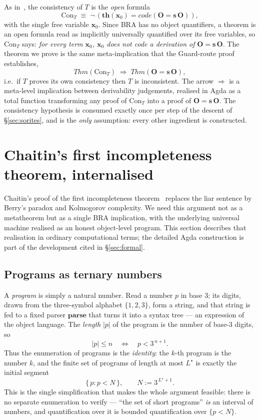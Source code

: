 \documentclass[11pt]{article}
\theoremstyle{plain}
\theoremstyle{definition}
\theoremstyle{remark}
\newcommand{\code}[1]{\mathit{code}(#1)}
\newcommand{\thmT}{\mathbf{th}}
\newcommand{\parse}{\mathbf{parse}}
\newcommand{\Con}{\mathrm{Con}}
\newcommand{\Thm}[1]{\mathit{Thm}(#1)}
\newcommand{\Lstar}{L^{\!\star}}
\begin{document}
As in~\cite{arGII}, the consistency of $T$ is the \emph{open} formula
\[
  \Con_T \;\equiv\; \neg\,(\thmT(\mathbf{x}_0) = \code{\mathbf{O}=\mathbf{s}\,\mathbf{O}}),
\]
with the single free variable $\mathbf{x}_0$. Since BRA has no object
quantifiers, a theorem is an open formula read as implicitly universally
quantified over its free variables, so $\Con_T$ says: \emph{for every
term $\mathbf{x}_0$, $\mathbf{x}_0$ does not code a derivation of}
$\mathbf{O}=\mathbf{s}\,\mathbf{O}$. The theorem we prove is the same
meta-implication that the Guard-route proof establishes,
\[
  \boxed{\;\Thm{\Con_T} \;\Longrightarrow\; \Thm{\mathbf{O}=\mathbf{s}\,\mathbf{O}},\;}
\]
i.e.\ if $T$ proves its own consistency then $T$ is inconsistent. The
arrow $\Longrightarrow$ is a meta-level implication between derivability
judgements, realised in Agda as a total function transforming any proof
of $\Con_T$ into a proof of $\mathbf{O}=\mathbf{s}\,\mathbf{O}$.
The consistency hypothesis is consumed exactly once per step of the
descent of \S\ref{sec:sorites}, and is the \emph{only} assumption: every
other ingredient is constructed.

\section{Chaitin's first incompleteness theorem, internalised}
\label{sec:chaitin}

Chaitin's proof of the first incompleteness theorem~\cite{Chaitin71,Chaitin74}
replaces the liar sentence by Berry's paradox and Kolmogorov complexity.
We need this argument not as a metatheorem but as a single BRA
implication, with the underlying universal machine realised as an honest
object-level program. This section describes that realisation in
ordinary computational terms; the detailed Agda construction is part of
the development cited in \S\ref{sec:formal}.

\subsection{Programs as ternary numbers}

A \emph{program} is simply a natural number. Read a number $p$ in base
$3$; its digits, drawn from the three-symbol alphabet $\{1,2,3\}$, form a
string, and that string is fed to a fixed parser $\parse$ that turns it
into a syntax tree --- an expression of the object language. The
\emph{length} $|p|$ of the program is the number of base-$3$ digits, so
\[
  |p| \le n \quad\Longleftrightarrow\quad p < 3^{\,n+1}.
\]
Thus the enumeration of programs is the \emph{identity}: the $k$-th
program is the number $k$, and the finite set of programs of length at
most $\Lstar$ is exactly the initial segment
\[
  \{\,p : p < N\,\}, \qquad N := 3^{\,\Lstar+1}.
\]
This is the single simplification that makes the whole argument
feasible: there is no separate enumeration to verify --- ``the set of
short programs'' \emph{is} an interval of numbers, and quantification
over it is bounded quantification over $\{p<N\}$.
\end{document}
